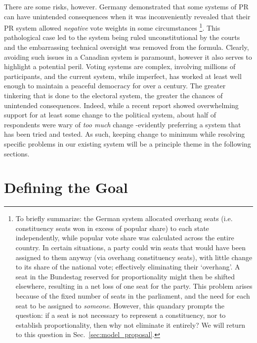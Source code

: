 \documentclass[DIV=calc, paper=a4, fontsize=11pt, twocolumn]{scrartcl}	 %
\begin{document}
There are some risks, however. Germany demonstrated that some systems of PR can have unintended consequences when it was inconveniently revealed that their PR system allowed \emph{negative} vote weights in some circumstances\cite{Die_Zeit_negative_vote} 
\footnote
{
To briefly summarize: the German system allocated overhang seats (i.e. constituency seats won in excess of popular share) to each state independently, while popular vote share was calculated across the entire country.
In certain situations, a party could win seats that would have been assigned to them anyway (via overhang constituency seats), with little change to its share of the national vote; effectively eliminating their `overhang'. A seat in the Bundestag reserved for proportionality might then be shifted elsewhere, resulting in a net loss of one seat for the party.
This problem arises because of the fixed number of seats in the parliament, and the need for each seat to be assigned to \emph{someone}. However, this quandary prompts the question: if a seat is not necessary to represent a constituency, nor to establish proportionality, then why not eliminate it entirely? We will return to this question in Sec.~\ref{sec:model_proposal}.
}.
This pathological case led to the system being ruled unconstitutional by the courts and the embarrassing technical oversight was removed from the formula. 
Clearly, avoiding such issues in a Canadian system is paramount, however it also serves to highlight a potential peril.
Voting systems are complex, involving millions of participants, and the current system, while imperfect, has worked at least well enough to maintain a peaceful democracy for over a century. The greater tinkering that is done to the electoral system, the greater the chances of unintended consequences. 
Indeed, while a recent report\cite{Broadbent_poll} showed overwhelming support for at least some change to the political system, about half of respondents were wary of \emph{too much} change \--evidently preferring a system that has been tried and tested. As such, keeping change to minimum while resolving specific problems in our existing system will be a principle theme in the following sections.


\section{Defining the Goal}
\label{sec:goal_list}
\end{document}
